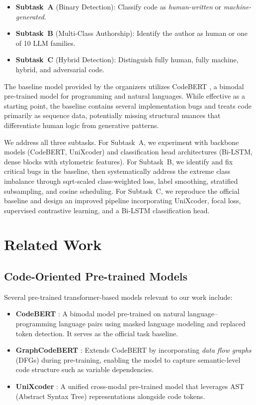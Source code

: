 \documentclass[11pt]{article}
\begin{document}
\begin{itemize}
    \item \textbf{Subtask~A} (Binary Detection): Classify code as \textit{human-written} or \textit{machine-generated}.
    \item \textbf{Subtask~B} (Multi-Class Authorship): Identify the author as human or one of 10 LLM families.
    \item \textbf{Subtask~C} (Hybrid Detection): Distinguish fully human, fully machine, hybrid, and adversarial code.
\end{itemize}

The baseline model provided by the organizers utilizes CodeBERT \cite{feng-etal-2020-codebert}, a bimodal pre-trained model for programming and natural languages. While effective as a starting point, the baseline contains several implementation bugs and treats code primarily as sequence data, potentially missing structural nuances that differentiate human logic from generative patterns.

We address all three subtasks. For Subtask~A, we experiment with backbone models (CodeBERT, UniXcoder) and classification head architectures (Bi-LSTM, dense blocks with stylometric features). For Subtask~B, we identify and fix critical bugs in the baseline, then systematically address the extreme class imbalance through sqrt-scaled class-weighted loss, label smoothing, stratified subsampling, and cosine scheduling. For Subtask~C, we reproduce the official baseline and design an improved pipeline incorporating UniXcoder, focal loss, supervised contrastive learning, and a Bi-LSTM classification head.

\section{Related Work}
\label{sec:related}

\subsection{Code-Oriented Pre-trained Models}

Several pre-trained transformer-based models relevant to our work include:
\begin{itemize}
    \item \textbf{CodeBERT} \cite{feng-etal-2020-codebert}: A bimodal model pre-trained on natural language--programming language pairs using masked language modeling and replaced token detection. It serves as the official task baseline.
    \item \textbf{GraphCodeBERT} \cite{guo2021graphcodebert}: Extends CodeBERT by incorporating \textit{data flow graphs} (DFGs) during pre-training, enabling the model to capture semantic-level code structure such as variable dependencies.
    \item \textbf{UniXcoder} \cite{guo2022unixcoder}: A unified cross-modal pre-trained model that leverages AST (Abstract Syntax Tree) representations alongside code tokens.
\end{itemize}
\end{document}
